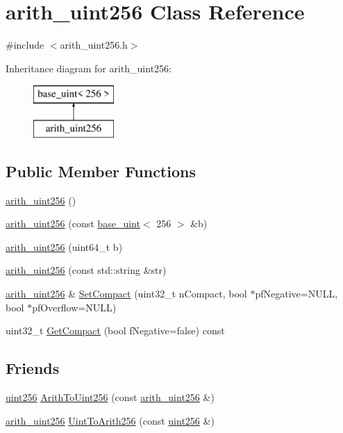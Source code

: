 \hypertarget{classarith__uint256}{}\section{arith\+\_\+uint256 Class Reference}
\label{classarith__uint256}


{\ttfamily \#include $<$arith\+\_\+uint256.\+h$>$}

Inheritance diagram for arith\+\_\+uint256\+:\begin{figure}[H]
\begin{center}
\leavevmode
\includegraphics[height=2.000000cm]{classarith__uint256}
\end{center}
\end{figure}
\subsection*{Public Member Functions}
\begin{DoxyCompactItemize}
\item 
\mbox{\hyperlink{classarith__uint256_a1dae7481f3ebf5457f70aaf385d566dd}{arith\+\_\+uint256}} ()
\item 
\mbox{\hyperlink{classarith__uint256_a86c126d261e0edeea49e051e2f3b98a7}{arith\+\_\+uint256}} (const \mbox{\hyperlink{classbase__uint}{base\+\_\+uint}}$<$ 256 $>$ \&b)
\item 
\mbox{\hyperlink{classarith__uint256_a865adeb2767f24e0efc3abfb3d75170b}{arith\+\_\+uint256}} (uint64\+\_\+t b)
\item 
\mbox{\hyperlink{classarith__uint256_a0e8b76f74ffb7a251b15aff89b087fbf}{arith\+\_\+uint256}} (const std\+::string \&str)
\item 
\mbox{\hyperlink{classarith__uint256}{arith\+\_\+uint256}} \& \mbox{\hyperlink{classarith__uint256_a458133c9f123519646b07e6143f2164f}{Set\+Compact}} (uint32\+\_\+t n\+Compact, bool $\ast$pf\+Negative=N\+U\+LL, bool $\ast$pf\+Overflow=N\+U\+LL)
\item 
uint32\+\_\+t \mbox{\hyperlink{classarith__uint256_a0eeee9d8f29143ddf1bff2b1ffa8fdc1}{Get\+Compact}} (bool f\+Negative=false) const
\end{DoxyCompactItemize}
\subsection*{Friends}
\begin{DoxyCompactItemize}
\item 
\mbox{\hyperlink{classuint256}{uint256}} \mbox{\hyperlink{classarith__uint256_aef075fd8d1a7e5937e9775b8e82c8a1b}{Arith\+To\+Uint256}} (const \mbox{\hyperlink{classarith__uint256}{arith\+\_\+uint256}} \&)
\item 
\mbox{\hyperlink{classarith__uint256}{arith\+\_\+uint256}} \mbox{\hyperlink{classarith__uint256_a9c9f84c20851f10a8ca5082bec97666a}{Uint\+To\+Arith256}} (const \mbox{\hyperlink{classuint256}{uint256}} \&)
\end{DoxyCompactItemize}
